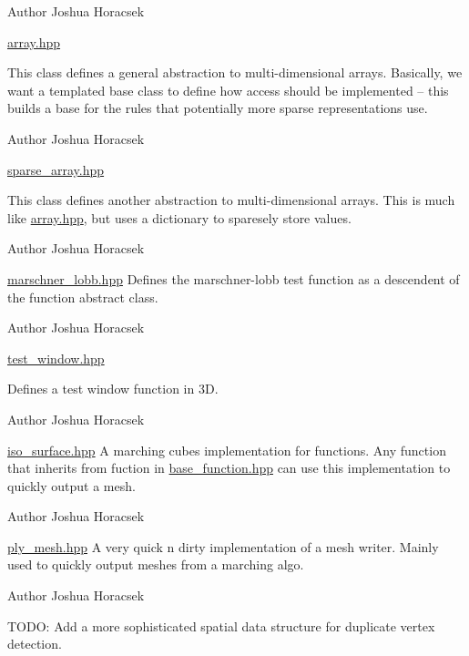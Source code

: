 \begin{DoxyAuthor}{Author}
Joshua Horacsek
\end{DoxyAuthor}
\hyperlink{array_8hpp_source}{array.\+hpp}

This class defines a general abstraction to multi-\/dimensional arrays. Basically, we want a templated base class to define how access should be implemented -- this builds a base for the rules that potentially more sparse representations use.

\begin{DoxyAuthor}{Author}
Joshua Horacsek
\end{DoxyAuthor}
\hyperlink{sparse__array_8hpp_source}{sparse\+\_\+array.\+hpp}

This class defines another abstraction to multi-\/dimensional arrays. This is much like \hyperlink{array_8hpp_source}{array.\+hpp}, but uses a dictionary to sparesely store values.

\begin{DoxyAuthor}{Author}
Joshua Horacsek
\end{DoxyAuthor}
\hyperlink{marschner__lobb_8hpp_source}{marschner\+\_\+lobb.\+hpp} Defines the marschner-\/lobb test function as a descendent of the function abstract class.

\begin{DoxyAuthor}{Author}
Joshua Horacsek
\end{DoxyAuthor}
\hyperlink{test__window_8hpp_source}{test\+\_\+window.\+hpp}

Defines a test window function in 3D.

\begin{DoxyAuthor}{Author}
Joshua Horacsek
\end{DoxyAuthor}
\hyperlink{iso__surface_8hpp_source}{iso\+\_\+surface.\+hpp} A marching cubes implementation for functions. Any function that inherits from fuction in \hyperlink{base__function_8hpp_source}{base\+\_\+function.\+hpp} can use this implementation to quickly output a mesh.

\begin{DoxyAuthor}{Author}
Joshua Horacsek
\end{DoxyAuthor}
\hyperlink{ply__mesh_8hpp_source}{ply\+\_\+mesh.\+hpp} A very quick n\textquotesingle{} dirty implementation of a mesh writer. Mainly used to quickly output meshes from a marching algo.

\begin{DoxyAuthor}{Author}
Joshua Horacsek
\end{DoxyAuthor}
T\+O\+DO\+: Add a more sophisticated spatial data structure for duplicate vertex detection.

